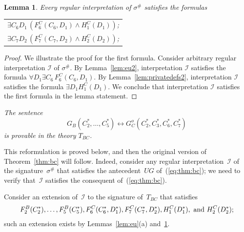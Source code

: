 \documentclass[11pt]{article}
\newtheorem{lemma}{Lemma}
\def\ug{\mathit{UG}}
\def\lrar{\leftrightarrow}
\def\beq{\begin{equation}}
\def\eeq#1{\label{#1}\end{equation}}
\def\I{\mathcal{I}}
\begin{document}
\begin{adjustwidth}{-1cm}{-1cm}
\medskip
\begin{lemma}\label{lem:eu2.2}
  Every regular interpretation of $\sigma^\#$ 
  satisfies
  the formulas
 \medskip
 
   \begin{tabular}{l} 
$\exists C_6 D_1\,(F^C_6(C_6,D_1)\wedge H^C_1(D_1))$;\\$\exists C_7 D_2\,(F^C_7(C_7,D_2)\wedge H^C_2(D_2))$;
 \end{tabular}

\end{lemma}
\begin{proof}  
  We illustrate the proof for the first formula. %
  Consider arbitrary regular interpretation $\I$ of $\sigma^\#$.
 By Lemma~\ref{lem:eu2},
  interpretation $\I$ satisfies the formula
  $\forall D_1\exists C_6\,F^C_6(C_6,D_1)$. 
By Lemma~\ref{lem:privatedefs2},  interpretation $\I$ satisfies the formula $\exists D_1 H^C_1(D_1)$. We conclude that interpretation $\I$ satisfies
the first formula in the lemma statement.
\end{proof}

\medskip{}
\emph{The sentence
  \beq
  G_B(C^*_2,\dots,C^*_5)\lrar  G^o_C(C^*_2, C^*_3, C^*_6, C^*_7) 
  \eeq{reform2.1}
is provable in the theory $T_{BC}$.}

\medskip
This reformulation is proved below, and then the
original version of Theorem~\ref{thm:bc}
will follow.  Indeed, consider any regular interpretation~$\I$
of the signature~$\sigma^\#$ that satisfies the antecedent~$\ug$
of~(\ref{eq:thm:bc}); we need to verify that~$\I$ satisfies the consequent
of~(\ref{eq:thm:bc}).

Consider an extension of~$\I$ to the signature of~$T_{BC}$ that
satisfies 
$$F^B_2(C_2^*),\dots,F^B_5(C_5^*),F^C_6(C_6^*,D^*_1),F^C_7(C_7^*,D^*_2), H^C_1(D^*_1),\hbox{ and }H^C_2(D^*_2);$$ 
such an extension exists by
Lemmas~\ref{lem:eu}(a) and~\ref{lem:eu2.2}. 



\end{adjustwidth}
\end{document}
